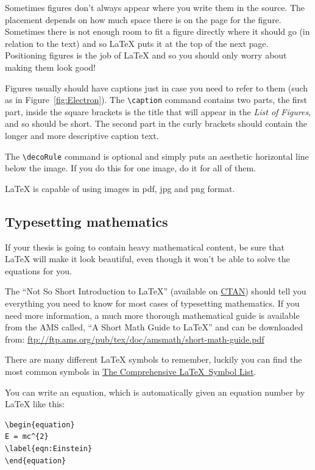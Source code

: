 Sometimes figures don't always appear where you write them in the source. The placement depends on how much space there is on the page for the figure. Sometimes there is not enough room to fit a figure directly where it should go (in relation to the text) and so \LaTeX{} puts it at the top of the next page. Positioning figures is the job of \LaTeX{} and so you should only worry about making them look good!

Figures usually should have captions just in case you need to refer to them (such as in Figure~\ref{fig:Electron}). The \verb|\caption| command contains two parts, the first part, inside the square brackets is the title that will appear in the \emph{List of Figures}, and so should be short. The second part in the curly brackets should contain the longer and more descriptive caption text.

The \verb|\decoRule| command is optional and simply puts an aesthetic horizontal line below the image. If you do this for one image, do it for all of them.

\LaTeX{} is capable of using images in pdf, jpg and png format.

\subsection{Typesetting mathematics}

If your thesis is going to contain heavy mathematical content, be sure that \LaTeX{} will make it look beautiful, even though it won't be able to solve the equations for you.

The \enquote{Not So Short Introduction to \LaTeX} (available on \href{http://www.ctan.org/tex-archive/info/lshort/english/lshort.pdf}{CTAN}) should tell you everything you need to know for most cases of typesetting mathematics. If you need more information, a much more thorough mathematical guide is available from the AMS called, \enquote{A Short Math Guide to \LaTeX} and can be downloaded from:
\url{ftp://ftp.ams.org/pub/tex/doc/amsmath/short-math-guide.pdf}

There are many different \LaTeX{} symbols to remember, luckily you can find the most common symbols in \href{http://ctan.org/pkg/comprehensive}{The Comprehensive \LaTeX~Symbol List}.

You can write an equation, which is automatically given an equation number by \LaTeX{} like this:
\begin{verbatim}
\begin{equation}
E = mc^{2}
\label{eqn:Einstein}
\end{equation}
\end{verbatim}

